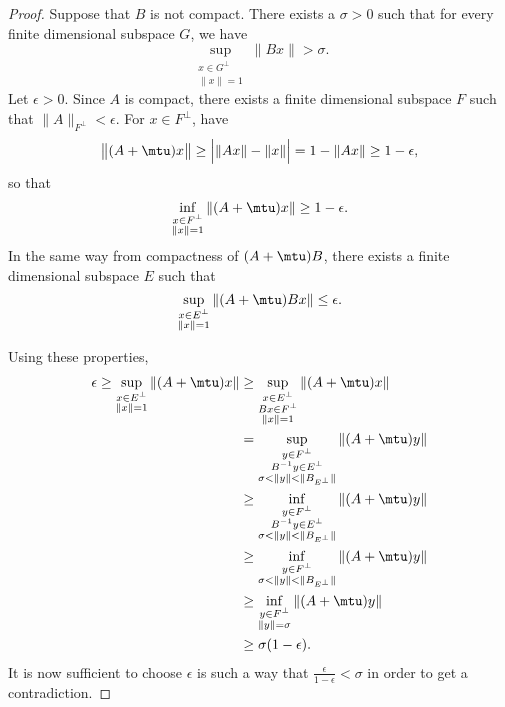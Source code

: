 \begin{proof}
	Suppose that $B$ is not compact. There exists a $\sigma>0$ such that for every finite dimensional subspace $G$, we have
	\begin{equation}
		\sup_{\substack{x\in G^{\perp}\\\| x \|=1}}\| Bx \|>\sigma.
	\end{equation}
	Let $\epsilon>0$. Since $A$ is compact, there exists a finite dimensional subspace $F$ such that $\| A \|_{F^{\perp}}<\epsilon$. For $x\in F^{\perp}$, have
	\begin{equation}
		\big\| (A+\mtu)x \big\|\geq\Big| \| Ax \|-\| x \| \Big|=1-\| Ax \|\geq 1-\epsilon,
	\end{equation}
	so that
	\begin{equation}
		\inf_{\substack{x\in F^{\perp}\\\| x \|=1}}\| (A+\mtu)x \|\geq 1-\epsilon.
	\end{equation}
	In the same way from compactness of $(A+\mtu)B$, there exists a finite dimensional subspace $E$ such that
	\begin{equation}
		\sup_{\substack{x\in E^{\perp}\\\| x \|=1}}\| (A+\mtu)Bx \|\leq \epsilon.
	\end{equation}

	Using these properties,
	\begin{equation}
		\begin{aligned}[]
			\epsilon\geq\sup_{\substack{x\in E^{\perp}\\\| x \|=1}}\| (A+\mtu)x \|&\geq\sup_{\substack{x\in E^{\perp}\\ Bx\in F^{\perp}\\\| x \|=1}}\| (A+\mtu)x \|\\
			&=\sup_{\substack{y\in F^{\perp}\\B^{-1}y\in E^{\perp}\\\sigma<\| y \|<\| B_{E^{\perp}} \|}}\| (A+\mtu)y \|\\
			&\geq\inf_{\substack{y\in F^{\perp}\\B^{-1}y\in E^{\perp}\\\sigma<\| y \|<\| B_{E^{\perp}} \|}}\| (A+\mtu)y \|\\
			&\geq\inf_{\substack{y\in F^{\perp}\\\sigma<\| y \|<\| B_{E^{\perp}} \|}}\| (A+\mtu)y \|\\
			&\geq\inf_{\substack{y\in F^{\perp}\\\| y \|=\sigma}}\| (A+\mtu)y \|\\
			&\geq \sigma(1-\epsilon).
		\end{aligned}
	\end{equation}
	It is now sufficient to choose $\epsilon$ is such a way that $\frac{ \epsilon }{ 1-\epsilon }<\sigma$ in order to get a contradiction.
\end{proof}

